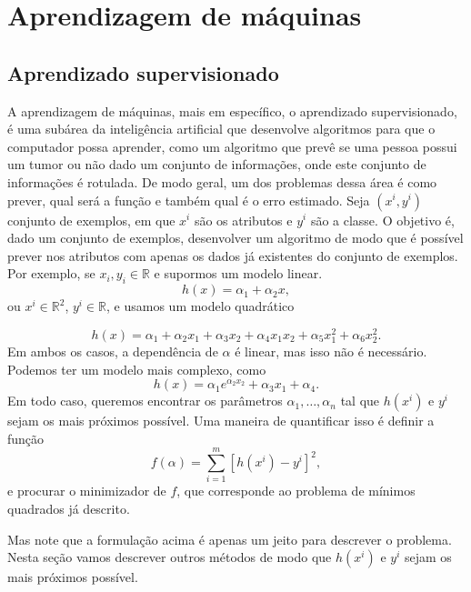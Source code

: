 \documentclass[
	12pt,				%
    oneside,			%
	a4paper,			%
	english,			%
	french,				%
	spanish,			%
	brazil,				%
	]{abntex2}
\begin{document}
\chapter{Aprendizagem de máquinas}
    \section{Aprendizado supervisionado}
        A aprendizagem de máquinas, mais em específico, o aprendizado supervisionado, é uma subárea da inteligência artificial que desenvolve algoritmos para que o computador possa aprender, como um algoritmo que prevê se uma pessoa possui um tumor ou não dado um conjunto de informações, onde este conjunto de informações é rotulada.
        De modo geral, um dos problemas dessa área é como prever, qual será a função e também qual é o erro estimado. Seja $(x^i,y^i)$ conjunto de exemplos, em que $x^i$ são os atributos e $y^i$ são a classe. O objetivo é, dado um conjunto de exemplos, desenvolver um algoritmo de modo que é possível prever nos atributos com apenas os dados já existentes do conjunto de exemplos. Por exemplo, se $x_i,y_i \in \mathbb{R}$ e supormos um modelo linear.
        \begin{equation}\label{eq:mod1}
            h(x) = \alpha_1 + \alpha_2x,
        \end{equation}
        ou $x^i\in\mathbb{R}^2$, $y^i\in\mathbb{R}$, e usamos um modelo quadrático

        \begin{equation}\label{eq:mod2}
            h(x) = \alpha_1 + \alpha_2 x_1 + \alpha_3 x_2 + \alpha_4 x_1x_2 + \alpha_5 x_1^2 + \alpha_6 x_2^2.
        \end{equation}
        Em ambos os casos, a dependência de $\alpha$ é linear, mas isso não é necessário.
        Podemos ter um modelo mais complexo, como
        $$ h(x) = \alpha_1 e^{\alpha_2 x_2} + \alpha_3 x_1 + \alpha_4. $$
        Em todo caso, queremos encontrar os parâmetros $\alpha_1,\dots,\alpha_n$ tal que $h(x^i)$ e $y^i$ sejam os mais
        próximos possível.
        Uma maneira de quantificar isso é definir a função
        \begin{equation*}
            f(\alpha) = \sum_{i=1}^m [ h(x^i) - y^i ]^2,
        \end{equation*}
        e procurar o minimizador de $f$, que corresponde ao problema de mínimos quadrados já descrito.

        Mas note que a formulação acima é apenas um jeito para descrever o problema. Nesta seção vamos descrever outros métodos de modo que $h(x^{i})$ e $y^i$ sejam os mais próximos possível.
\end{document}
